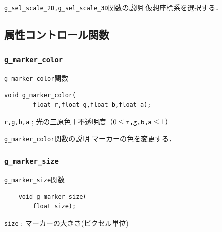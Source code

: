 \documentclass[a4paper,12pt]{jsarticle}%
\begin{document}
\begin{itembox}[l]{\texttt{g\_sel\_scale\_2D,g\_sel\_scale\_3D}関数の説明}
仮想座標系を選択する．
\end{itembox}


\clearpage
\subsection{属性コントロール関数}

\subsubsection{\texttt{g\_marker\_color}}

\begin{itembox}[l]{\texttt{g\_marker\_color}関数}
\begin{verbatim}
void g_marker_color(
        float r,float g,float b,float a);
\end{verbatim}
\verb|r,g,b,a| ; 光の三原色＋不透明度（$0\leq \verb|r,g,b,a| \leq 1$）\\
\end{itembox}

\begin{itembox}[l]{\texttt{g\_marker\_color}関数の説明}
マーカーの色を変更する．
\end{itembox}

\subsubsection{\texttt{g\_marker\_size}}

\begin{itembox}[l]{\texttt{g\_marker\_size}関数}
	\begin{verbatim}
	void g_marker_size(
        float size);
	\end{verbatim}
	\verb|size| ; マーカーの大きさ(ピクセル単位)\\
\end{itembox}
\end{document}
